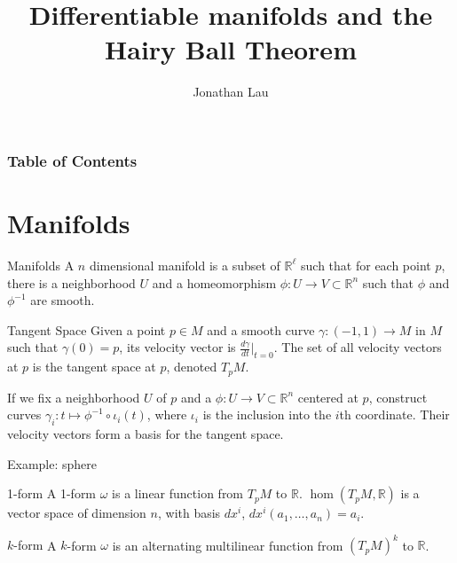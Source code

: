 \documentclass[9pt]{beamer}
\title[Differentiable manifolds and the Hairy Ball Theorem]
{Differentiable manifolds and the Hairy Ball Theorem}
\author[Jonathan Lau] %
{Jonathan Lau}
\begin{document}
	
\frame{\titlepage}

\begin{frame}
	\frametitle{Table of Contents}
	\tableofcontents
\end{frame}

\section{Manifolds}
	
\begin{frame}
    \begin{block}{Manifolds}
        A $n$ dimensional manifold is a subset of $\mathbb{R}^\ell$ such that for each point $p$, there is a neighborhood $U$ and a homeomorphism $\phi:U\rightarrow V\subset \mathbb{R}^n$ such that $\phi$ and $\phi^{-1}$ are smooth.
    \end{block}
\end{frame}

\begin{frame}
    \begin{block}{Tangent Space}
        Given a point $p\in M$ and a smooth curve $\gamma:(-1,1)\rightarrow M$ in $M$ such that $\gamma(0)=p$, its velocity vector is $\frac{d\gamma}{dt}\vert_{t=0}$. The set of all velocity vectors at $p$ is the tangent space at $p$, denoted $T_p M$.
    \end{block}
    If we fix a neighborhood $U$ of $p$ and a $\phi:U\rightarrow V\subset \mathbb{R}^n$ centered at $p$, construct curves $\gamma_i:t\mapsto \phi^{-1}\circ\iota_i(t)$, where $\iota_i$ is the inclusion into the $i$th coordinate. Their velocity vectors form a basis for the tangent space.

    Example: sphere
\end{frame}

\begin{frame}
    \begin{block}{1-form}
        A 1-form $\omega$ is a linear function from $T_p M$ to $\mathbb{R}$. $\hom(T_p M, \mathbb{R})$ is a vector space of dimension $n$, with basis $dx^i$, $dx^i(a_1, \dots, a_n) = a_i$.
    \end{block}

    \begin{block}{$k$-form}
        A $k$-form $\omega$ is an alternating multilinear function from $(T_p M)^k$ to $\mathbb{R}$.
    \end{block}
\end{frame}
\end{document}
